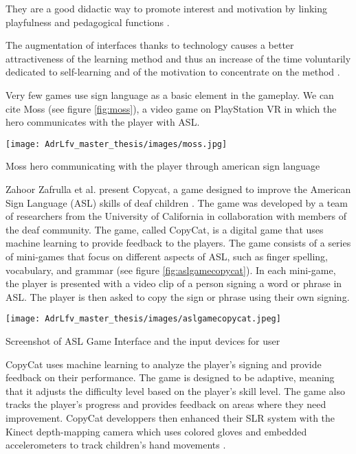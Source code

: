They are a good didactic way to promote interest and motivation by linking playfulness and pedagogical functions \cite{tejeiro2009efectos} .

The augmentation of interfaces thanks to technology causes a better attractiveness of the learning method and thus an increase of the time voluntarily dedicated to self-learning and of the motivation to concentrate on the method \cite{baker1994}.

Very few games use sign language as a basic element in the gameplay. We can cite Moss \cite{moss2018} (see figure \ref{fig:moss}), a video game on PlayStation VR in which the hero communicates with the player with ASL. 

\begin{marginfigure}
    \centering
    \texttt{[image: AdrLfv\_master\_thesis/images/moss.jpg]}
    \caption{Moss hero communicating with the player through american sign language}
    \label{fig:moss}
\end{marginfigure}

Zahoor Zafrulla et al. present Copycat, a game designed to improve the American Sign Language (ASL) skills of deaf children \cite{zafrulla2011copycat}. The game was developed by a team of researchers from the University of California in collaboration with members of the deaf community.
The game, called CopyCat, is a digital game that uses machine learning to provide feedback to the players. The game consists of a series of mini-games that focus on different aspects of ASL, such as finger spelling, vocabulary, and grammar (see figure \ref{fig:aslgamecopycat}). In each mini-game, the player is presented with a video clip of a person signing a word or phrase in ASL. The player is then asked to copy the sign or phrase using their own signing.

\begin{marginfigure}
    \centering
    \texttt{[image: AdrLfv\_master\_thesis/images/aslgamecopycat.jpeg]}
    \caption{Screenshot of ASL Game Interface and the input devices for user  }
    \label{fig:aslgamecopycat}
\end{marginfigure}

CopyCat uses machine learning to analyze the player's signing and provide feedback on their performance. The game is designed to be adaptive, meaning that it adjusts the difficulty level based on the player's skill level. The game also tracks the player's progress and provides feedback on areas where they need improvement.
CopyCat developpers then enhanced their SLR system with the Kinect depth-mapping camera which uses colored gloves and embedded accelerometers to track children's hand movements \cite{zafrulla2011american}.

